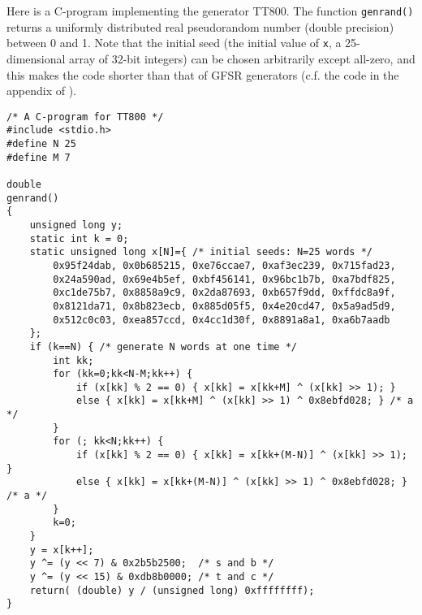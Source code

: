 Here is a C-program implementing the generator TT800.
The function {\tt genrand()}
returns a uniformly distributed real pseudorandom number
(double precision) between 0 and 1.
Note that the initial seed 
(the initial value of {\tt x}, a 25-dimensional 
array of 32-bit integers)
can be chosen arbitrarily except all-zero, and this makes the code shorter
than that of GFSR generators
(c.f. the code in the appendix of \cite{fushimi2}).
{\scriptsize
\begin{verbatim}
/* A C-program for TT800 */
#include <stdio.h>
#define N 25
#define M 7

double
genrand()
{
    unsigned long y;
    static int k = 0;
    static unsigned long x[N]={ /* initial seeds: N=25 words */
        0x95f24dab, 0x0b685215, 0xe76ccae7, 0xaf3ec239, 0x715fad23,
        0x24a590ad, 0x69e4b5ef, 0xbf456141, 0x96bc1b7b, 0xa7bdf825,
        0xc1de75b7, 0x8858a9c9, 0x2da87693, 0xb657f9dd, 0xffdc8a9f,
        0x8121da71, 0x8b823ecb, 0x885d05f5, 0x4e20cd47, 0x5a9ad5d9,
        0x512c0c03, 0xea857ccd, 0x4cc1d30f, 0x8891a8a1, 0xa6b7aadb
    };
    if (k==N) { /* generate N words at one time */
        int kk;
        for (kk=0;kk<N-M;kk++) {
            if (x[kk] % 2 == 0) { x[kk] = x[kk+M] ^ (x[kk] >> 1); }
            else { x[kk] = x[kk+M] ^ (x[kk] >> 1) ^ 0x8ebfd028; } /* a */
        }
        for (; kk<N;kk++) {
            if (x[kk] % 2 == 0) { x[kk] = x[kk+(M-N)] ^ (x[kk] >> 1); }
            else { x[kk] = x[kk+(M-N)] ^ (x[kk] >> 1) ^ 0x8ebfd028; } /* a */
        }
        k=0;
    }
    y = x[k++];
    y ^= (y << 7) & 0x2b5b2500;  /* s and b */
    y ^= (y << 15) & 0xdb8b0000; /* t and c */
    return( (double) y / (unsigned long) 0xffffffff);
}
\end{verbatim}
}

